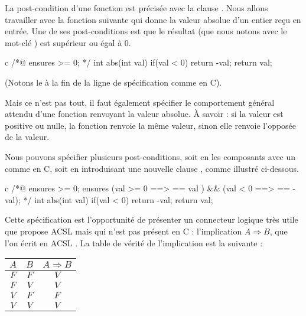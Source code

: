 \documentclass[middle]{zmdocument}
\begin{document}


La post-condition d'une fonction est précisée avec la clause . 
Nous allons travailler avec la fonction suivante qui donne la valeur absolue
d'un entier reçu en entrée. 
Une de ses post-conditions est que le résultat (que nous notons avec le 
mot-clé ) est supérieur ou égal à 0.



\begin{CodeBlock}{c}
/*@
  ensures \result >= 0;
*/
int abs(int val){
  if(val < 0) return -val;
  return val;
}
\end{CodeBlock}



(Notons le \CodeInline{;} à la fin de la ligne de spécification comme en C).



Mais ce n'est pas tout, il faut également spécifier le comportement général 
attendu d'une fonction renvoyant la valeur absolue. À savoir : si la valeur
est positive ou nulle, la fonction renvoie la même valeur, sinon elle renvoie 
l'opposée de la valeur.



Nous pouvons spécifier plusieurs post-conditions, soit en les composants avec 
un \CodeInline{\&\&} comme en C, soit en introduisant une nouvelle clause , 
comme illustré ci-dessous.



\begin{CodeBlock}{c}
/*@
  ensures \result >= 0;
  ensures (val >= 0 ==> \result == val ) && 
          (val <  0 ==> \result == -val);
*/
int abs(int val){
  if(val < 0) return -val;
  return val;
}
\end{CodeBlock}



Cette spécification est l'opportunité de présenter un connecteur logique 
très utile que propose ACSL mais qui n'est pas présent en C : 
l'implication $A \Rightarrow B$, que l'on écrit en ACSL .
La table de vérité de l'implication est la suivante :



\begin{longtabu}{|c|c|c|} \hline
$A$ & $B$ & $A \Rightarrow B$ \\ \hline
$F$ & $F$ & $V$ \\ \hline
$F$ & $V$ & $V$ \\ \hline
$V$ & $F$ & $F$ \\ \hline
$V$ & $V$ & $V$ \\ \hline
\end{longtabu}
\end{document}
